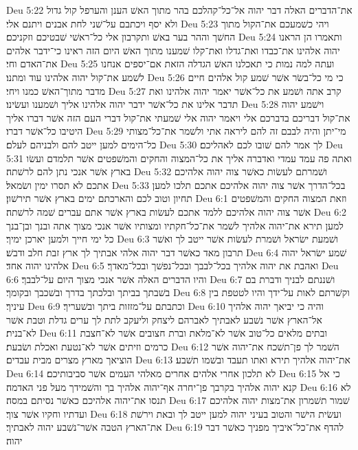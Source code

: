 Deu 5:22  את־הדברים האלה דבר יהוה אל־כל־קהלכם בהר מתוך האשׁ הענן והערפל קול גדול ולא יסף ויכתבם על־שׁני לחת אבנים ויתנם אלי׃
Deu 5:23  ויהי כשׁמעכם את־הקול מתוך החשׁך וההר בער באשׁ ותקרבון אלי כל־ראשׁי שׁבטיכם וזקניכם׃
Deu 5:24  ותאמרו הן הראנו יהוה אלהינו את־כבדו ואת־גדלו ואת־קלו שׁמענו מתוך האשׁ היום הזה ראינו כי־ידבר אלהים את־האדם וחי׃
Deu 5:25  ועתה למה נמות כי תאכלנו האשׁ הגדלה הזאת אם־יספים אנחנו לשׁמע את־קול יהוה אלהינו עוד ומתנו׃
Deu 5:26  כי מי כל־בשׂר אשׁר שׁמע קול אלהים חיים מדבר מתוך־האשׁ כמנו ויחי׃
Deu 5:27  קרב אתה ושׁמע את כל־אשׁר יאמר יהוה אלהינו ואת תדבר אלינו את כל־אשׁר ידבר יהוה אלהינו אליך ושׁמענו ועשׂינו׃
Deu 5:28  וישׁמע יהוה את־קול דבריכם בדברכם אלי ויאמר יהוה אלי שׁמעתי את־קול דברי העם הזה אשׁר דברו אליך היטיבו כל־אשׁר דברו׃
Deu 5:29  מי־יתן והיה לבבם זה להם ליראה אתי ולשׁמר את־כל־מצותי כל־הימים למען ייטב להם ולבניהם לעלם׃
Deu 5:30  לך אמר להם שׁובו לכם לאהליכם׃
Deu 5:31  ואתה פה עמד עמדי ואדברה אליך את כל־המצוה והחקים והמשׁפטים אשׁר תלמדם ועשׂו בארץ אשׁר אנכי נתן להם לרשׁתה׃
Deu 5:32  ושׁמרתם לעשׂות כאשׁר צוה יהוה אלהיכם אתכם לא תסרו ימין ושׂמאל׃
Deu 5:33  בכל־הדרך אשׁר צוה יהוה אלהיכם אתכם תלכו למען תחיון וטוב לכם והארכתם ימים בארץ אשׁר תירשׁון׃
Deu 6:1  וזאת המצוה החקים והמשׁפטים אשׁר צוה יהוה אלהיכם ללמד אתכם לעשׂות בארץ אשׁר אתם עברים שׁמה לרשׁתה׃
Deu 6:2  למען תירא את־יהוה אלהיך לשׁמר את־כל־חקתיו ומצותיו אשׁר אנכי מצוך אתה ובנך ובן־בנך כל ימי חייך ולמען יארכן ימיך׃
Deu 6:3  ושׁמעת ישׂראל ושׁמרת לעשׂות אשׁר ייטב לך ואשׁר תרבון מאד כאשׁר דבר יהוה אלהי אבתיך לך ארץ זבת חלב ודבשׁ׃
Deu 6:4  שׁמע ישׂראל יהוה אלהינו יהוה אחד׃
Deu 6:5  ואהבת את יהוה אלהיך בכל־לבבך ובכל־נפשׁך ובכל־מאדך׃
Deu 6:6  והיו הדברים האלה אשׁר אנכי מצוך היום על־לבבך׃
Deu 6:7  ושׁננתם לבניך ודברת בם בשׁבתך בביתך ובלכתך בדרך ובשׁכבך ובקומך׃
Deu 6:8  וקשׁרתם לאות על־ידך והיו לטטפת בין עיניך׃
Deu 6:9  וכתבתם על־מזזות ביתך ובשׁעריך׃
Deu 6:10  והיה כי יביאך יהוה אלהיך אל־הארץ אשׁר נשׁבע לאבתיך לאברהם ליצחק וליעקב לתת לך ערים גדלת וטבת אשׁר לא־בנית׃
Deu 6:11  ובתים מלאים כל־טוב אשׁר לא־מלאת וברת חצובים אשׁר לא־חצבת כרמים וזיתים אשׁר לא־נטעת ואכלת ושׂבעת׃
Deu 6:12  השׁמר לך פן־תשׁכח את־יהוה אשׁר הוציאך מארץ מצרים מבית עבדים׃
Deu 6:13  את־יהוה אלהיך תירא ואתו תעבד ובשׁמו תשׁבע׃
Deu 6:14  לא תלכון אחרי אלהים אחרים מאלהי העמים אשׁר סביבותיכם׃
Deu 6:15  כי אל קנא יהוה אלהיך בקרבך פן־יחרה אף־יהוה אלהיך בך והשׁמידך מעל פני האדמה׃
Deu 6:16  לא תנסו את־יהוה אלהיכם כאשׁר נסיתם במסה׃
Deu 6:17  שׁמור תשׁמרון את־מצות יהוה אלהיכם ועדתיו וחקיו אשׁר צוך׃
Deu 6:18  ועשׂית הישׁר והטוב בעיני יהוה למען ייטב לך ובאת וירשׁת את־הארץ הטבה אשׁר־נשׁבע יהוה לאבתיך׃
Deu 6:19  להדף את־כל־איביך מפניך כאשׁר דבר יהוה׃
